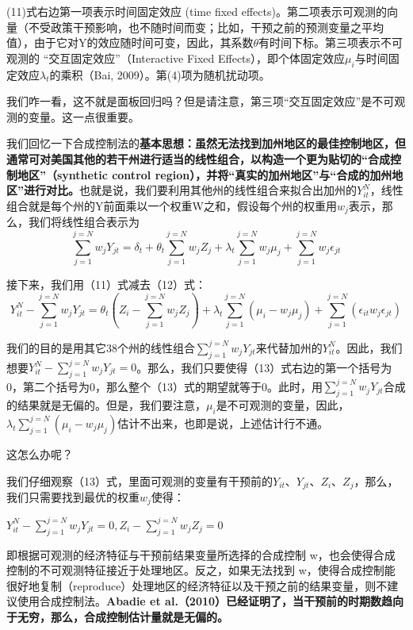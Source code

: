 \documentclass[cn,10pt,math=newtx,citestyle=gb7714-2015,bibstyle=gb7714-2015]{elegantbook}
\begin{document}
	(11)式右边第一项表示时间固定效应 (time fixed effects)。第二项表示可观测的向量（不受政策干预影响，也不随时间而变；比如，干预之前的预测变量之平均值），由于它对Y的效应随时间可变，因此，其系数$\theta$有时间下标。第三项表示不可观测的 “交互固定效应”（Interactive Fixed Effects），即个体固定效应$\mu_i$与时间固定效应$\lambda_t$的乘积（Bai, 2009）。第(4)项为随机扰动项。
	
	我们咋一看，这不就是面板回归吗？但是请注意，第三项“交互固定效应”是不可观测的变量。这一点很重要。
	
	我们回忆一下合成控制法的\textbf{基本思想：虽然无法找到加州地区的最佳控制地区，但通常可对美国其他的若干州进行适当的线性组合，以构造一个更为贴切的“合成控制地区”（synthetic control region），并将“真实的加州地区”与“合成的加州地区”进行对比。}也就是说，我们要利用其他州的线性组合来拟合出加州的$Y_{it}^N$，线性组合就是每个州的Y前面乘以一个权重W之和，假设每个州的权重用$w_j$表示，那么，我们将线性组合表示为
	\begin{equation}
		\sum_{j=1}^{j=N}w_jY_{jt}=\delta_t+\theta_t\sum_{j=1}^{j=N}w_jZ_j+\lambda_t\sum_{j=1}^{j=N}w_j\mu_j+\sum_{j=1}^{j=N}w_j\epsilon_{jt}
	\end{equation}
	
	接下来，我们用（11）式减去（12）式：
	\begin{equation}
		Y_{it}^N-\sum_{j=1}^{j=N}w_jY_{jt}=\theta_t(Z_i-\sum_{j=1}^{j=N}w_jZ_j)+\lambda_t\sum_{j=1}^{j=N}(\mu_i-w_j\mu_j)+\sum_{j=1}^{j=N}(\epsilon_{it}w_j\epsilon_{jt})
	\end{equation}
	
	我们的目的是用其它38个州的线性组合$\sum_{j=1}^{j=N}w_jY_{jt}$来代替加州的$Y_{it}^N$。因此，我们想要$Y_{it}^N-\sum_{j=1}^{j=N}w_jY_{jt}=0$。那么，我们只要使得（13）式右边的第一个括号为0，第二个括号为0，那么整个（13）式的期望就等于0。此时，用$\sum_{j=1}^{j=N}w_jY_{jt}$合成的结果就是无偏的。但是，我们要注意，$\mu_i$是不可观测的变量，因此，$\lambda_t\sum_{j=1}^{j=N}(\mu_i-w_j\mu_j)$估计不出来，也即是说，上述估计行不通。
	
	这怎么办呢？
	
	我们仔细观察（13）式，里面可观测的变量有干预前的$Y_{it}$、$Y_{jt}$、$Z_i$、$Z_j$，那么，我们只需要找到最优的权重$w_j$使得：
	\begin{center}
		$Y_{it}^N-\sum_{j=1}^{j=N}w_jY_{jt}=0,Z_i-\sum_{j=1}^{j=N}w_jZ_j=0$
	\end{center}
	
	即根据可观测的经济特征与干预前结果变量所选择的合成控制 w，也会使得合成控制的不可观测特征接近于处理地区。反之，如果无法找到 w，使得合成控制能很好地复制（reproduce）处理地区的经济特征以及干预之前的结果变量，则不建议使用合成控制法。\textbf{Abadie et al.（2010）已经证明了，当干预前的时期数趋向于无穷，那么，合成控制估计量就是无偏的。}
	
\end{document}
